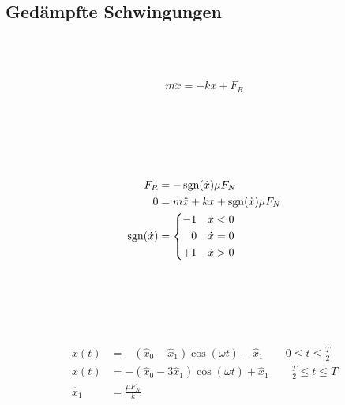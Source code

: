 \subsection{Gedämpfte Schwingungen}

\begin{boxleft}
\\
\\
\end{boxleft}\begin{boxrightshaded}
\begin{align}
m\ddot{x}=-kx+F_R
\end{align}
\end{boxrightshaded}

\begin{boxleft}
\\
\\
\\
\\
\end{boxleft}\begin{boxrightshaded}
\begin{align}
F_R&=-\operatorname{sgn}({\dot{x}})\mu F_N\\
0&=m\ddot{x}+kx+\operatorname{sgn}({\dot{x}})\mu F_N\\
\operatorname{sgn}({\dot{x}})&=
\begin{dcases*}
  -1&$\dot{x}<0$\\
\phantom{+}0& $\dot{x}=0$\\
  +1&$\dot{x}>0$
\end{dcases*}
\end{align}
\end{boxrightshaded}

\begin{boxleft}
\\
\\
\\
\\
\end{boxleft}\begin{boxrightshaded}
\begin{align}
x(t)&=-(\hat{x}_0-\hat{x}_1)\cos(\omega t)-\hat{x}_1\qquad 0\leq t\leq \frac{T}{2}\\
x(t)&=-(\hat{x}_0-3\hat{x}_1)\cos(\omega t)+\hat{x}_1\qquad \frac{T}{2}\leq t\leq T\\
\hat{x}_1&=\frac{\mu F_N}{k}
\end{align}
\end{boxrightshaded}

